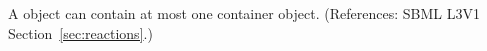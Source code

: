 A \KineticLaw object can contain at most one \ListOfLocalParameters
container object.  (References: SBML L3V1 Section~\ref{sec:reactions}.)
